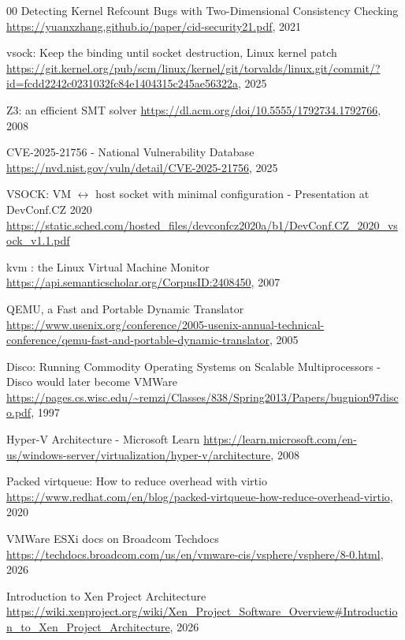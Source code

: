 \begin{thebibliography}{00}
Detecting Kernel Refcount Bugs with Two-Dimensional Consistency Checking
\url{https://yuanxzhang.github.io/paper/cid-security21.pdf}, 2021

vsock: Keep the binding until socket destruction, Linux kernel patch
\url{https://git.kernel.org/pub/scm/linux/kernel/git/torvalds/linux.git/commit/?id=fcdd2242c0231032fc84e1404315c245ae56322a}, 2025

Z3: an efficient SMT solver
\url{https://dl.acm.org/doi/10.5555/1792734.1792766}, 2008


CVE-2025-21756 - National Vulnerability Database
\url{https://nvd.nist.gov/vuln/detail/CVE-2025-21756}, 2025

VSOCK: VM $\longleftrightarrow$ host socket with minimal configuration - Presentation at DevConf.CZ 2020
\url{https://static.sched.com/hosted_files/devconfcz2020a/b1/DevConf.CZ_2020_vsock_v1.1.pdf}


kvm : the Linux Virtual Machine Monitor
\url{https://api.semanticscholar.org/CorpusID:2408450}, 2007

QEMU, a Fast and Portable Dynamic Translator
\url{https://www.usenix.org/conference/2005-usenix-annual-technical-conference/qemu-fast-and-portable-dynamic-translator}, 2005

Disco: Running Commodity Operating Systems on Scalable Multiprocessors - Disco would later become VMWare
\url{https://pages.cs.wisc.edu/~remzi/Classes/838/Spring2013/Papers/bugnion97disco.pdf}, 1997

Hyper-V Architecture - Microsoft Learn
\url{https://learn.microsoft.com/en-us/windows-server/virtualization/hyper-v/architecture}, 2008

Packed virtqueue: How to reduce overhead with virtio
\url{https://www.redhat.com/en/blog/packed-virtqueue-how-reduce-overhead-virtio}, 2020

VMWare ESXi docs on Broadcom Techdocs
\url{https://techdocs.broadcom.com/us/en/vmware-cis/vsphere/vsphere/8-0.html}, 2026

Introduction to Xen Project Architecture
\url{https://wiki.xenproject.org/wiki/Xen_Project_Software_Overview#Introduction_to_Xen_Project_Architecture}, 2026


\end{thebibliography}
